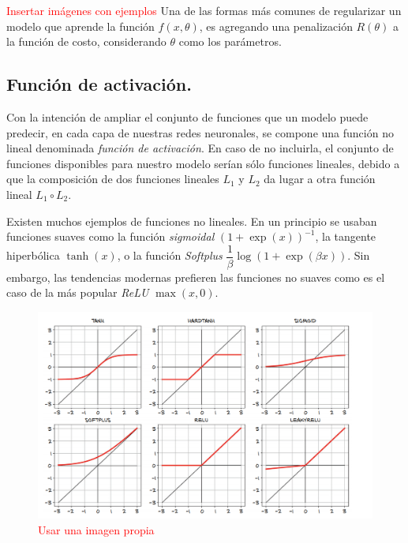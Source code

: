     \textcolor{red}{Insertar imágenes con ejemplos}
    Una de las formas más comunes de regularizar un modelo que aprende la función $f(x, \theta)$, es agregando una penalización $R(\theta)$ a la función de costo, considerando $\theta$ como los parámetros.
    \subsection{Función de activación.
    }
    Con la intención de ampliar el conjunto de funciones que un modelo puede predecir, en cada capa de nuestras redes neuronales, se compone una función no lineal denominada \textsl{función de activación}. En caso de no incluirla, el conjunto de funciones disponibles para nuestro modelo serían sólo funciones lineales, debido a que la composición de dos funciones lineales $L_1$ y $L_2$ da lugar a otra función lineal $L_1 \circ L_2$.

    Existen muchos ejemplos de funciones no lineales. En un principio se usaban funciones suaves como la función \textsl{sigmoidal} $(1+\exp(x))^{-1}$, la tangente hiperbólica $\tanh(x)$, o la función \textsl{Softplus} $\dfrac{1}{\beta} \log(1+ \exp(\beta x))$. Sin embargo, las tendencias modernas prefieren las funciones no suaves como es el caso de la más popular \textsl{ReLU} $\max(x,0)$.

    \begin{figure}[H]
        \centering
        \includegraphics[width=6in]{../cap1_preliminares/src/activations.png}
        \caption{\textcolor{red}{Usar una imagen propia}}
    \end{figure}
    
